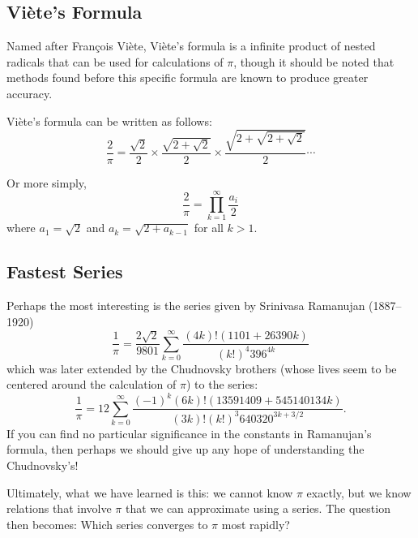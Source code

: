 \subsection{Vi\`{e}te's Formula}

Named after Fran\c{c}ois Vi\`{e}te, Vi\`{e}te's formula is a infinite
product of nested radicals that can be used for calculations of $\pi$,
though it should be noted that methods found before this specific
formula are known to produce greater accuracy.

Vi\`{e}te's formula can be written as follows:
\[
  \frac{2}{\pi} = \frac{\sqrt{2}}{2} \times \frac{\sqrt{2 +
  \sqrt{2}}}{2} \times \frac{\sqrt{2 + \sqrt{2 + \sqrt{2}}}}{2} \cdots
\]

Or more simply,
\[
  \frac{2}{\pi} = \prod_{k=1}^{\infty} \frac{a_i}{2}
\]
where $a_1 = \sqrt{2}$ and $a_k = \sqrt{2 + a_{k-1}}$ for all $k > 1$.


\subsection{Fastest Series}

Perhaps the most interesting is the series given by Srinivasa Ramanujan
(1887--1920)
$$
\frac{1}{\pi}=\frac{2 \sqrt{2}}{9801} \sum_{k=0}^\infty \frac{(4k)!
(1101 + 26390 k)}{(k!)^4 396^{4k}}
$$
which was later extended by the Chudnovsky brothers (whose lives seem to
be centered around the calculation of $\pi$) to the series:
$$
\frac{1}{\pi} = 12 \sum_{k=0}^\infty \frac{(-1)^k (6k)! (13591409 +
545140134 k)}{(3k)! (k!)^3 640320^{3k + 3/2}} .
$$
If you can find no particular significance in the constants in
Ramanujan's formula, then perhaps we should give up any hope of
understanding the Chudnovsky's!

Ultimately, what we have learned is this: we cannot know $\pi$ exactly,
but we know relations that involve $\pi$ that we can approximate using a
series. The question then becomes: Which series converges to $\pi$ most
rapidly?
